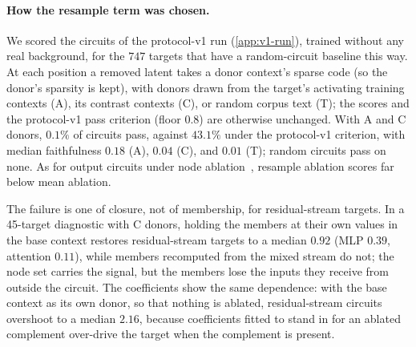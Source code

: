 \documentclass[10pt]{article}
\begin{document}
\paragraph{How the resample term was chosen.}
We scored the circuits of the protocol-v1 run (\cref{app:v1-run}), trained without any real background, for the $747$ targets that have a random-circuit baseline this way.
At each position a removed latent takes a donor context's sparse code (so the donor's sparsity is kept), with donors drawn from the target's activating training contexts (A), its contrast contexts (C), or random corpus text (T); the scores and the protocol-v1 pass criterion (floor $0.8$) are otherwise unchanged.
With A and C donors, $0.1\%$ of circuits pass, against $43.1\%$ under the protocol-v1 criterion, with median faithfulness $0.18$ (A), $0.04$ (C), and $0.01$ (T); random circuits pass on none.
As for output circuits under node ablation~\citep{miller2024transformer}, resample ablation scores far below mean ablation.

The failure is one of closure, not of membership, for residual-stream targets.
In a 45-target diagnostic with C donors, holding the members at their own values in the base context restores residual-stream targets to a median $0.92$ (MLP $0.39$, attention $0.11$), while members recomputed from the mixed stream do not; the node set carries the signal, but the members lose the inputs they receive from outside the circuit.
The coefficients show the same dependence: with the base context as its own donor, so that nothing is ablated, residual-stream circuits overshoot to a median $2.16$, because coefficients fitted to stand in for an ablated complement over-drive the target when the complement is present.
\end{document}
